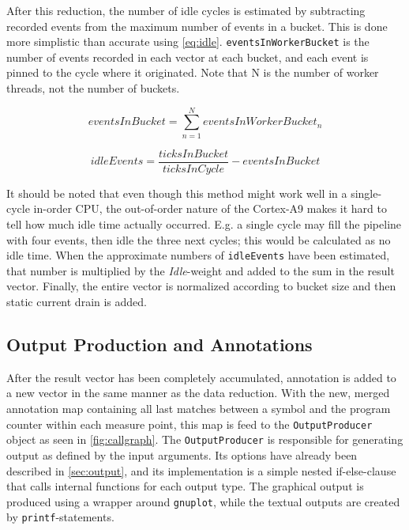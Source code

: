 After this reduction, the number of idle cycles is estimated by subtracting
recorded events from the maximum number of events in a bucket. This is done more
simplistic than accurate using \autoref{eq:idle}. \texttt{eventsInWorkerBucket} is the
number of events recorded in each vector at each bucket, and each event is
pinned to the cycle where it originated. Note that N is the number of worker
threads, not the number of buckets.

\begin{equation}
    eventsInBucket = \sum_{n=1}^{N} eventsInWorkerBucket_n
\end{equation}

\begin{equation}
    idleEvents = \frac{ticksInBucket}{ticksInCycle} - eventsInBucket
\label{eq:idle}
\end{equation}

It should be noted that even though this method might work well in a
single-cycle in-order CPU, the out-of-order nature of the Cortex-A9 makes it
hard to tell how much idle time actually occurred. E.g. a single cycle may fill
the pipeline with four events, then idle the three next cycles; this would be
calculated as no idle time. When the approximate numbers of \texttt{idleEvents} have been
estimated, that number is multiplied by the \emph{Idle}-weight and added to the
sum in the result vector. Finally, the entire vector is normalized according to
bucket size and then static current drain is added.


\subsection{Output Production and Annotations}

After the result vector has been completely accumulated, annotation is added to
a new vector in the same manner as the data reduction. With the new, merged
annotation map containing all last matches between a symbol and the program
counter within each measure point, this map is feed to the
\texttt{OutputProducer} object as seen in \autoref{fig:callgraph}. The
\texttt{OutputProducer} is responsible for generating output as defined by the
input arguments. Its options have already been described in
\autoref{sec:output}, and its implementation is a simple nested if-else-clause
that calls internal functions for each output type. The graphical output is
produced using a wrapper around \texttt{gnuplot}, while the textual outputs are
created by \texttt{printf}-statements.


